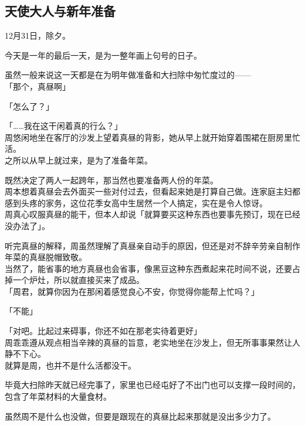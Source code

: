 \subsection{天使大人与新年准备}

12月31日，除夕。

今天是一年的最后一天，是为一整年画上句号的日子。

虽然一般来说这一天都是在为明年做准备和大扫除中匆忙度过的——\\

「那个，真昼啊」

「怎么了？」

「……我在这干闲着真的行么？」\\

周悠闲地坐在客厅的沙发上望着真昼的背影，她从早上就开始穿着围裙在厨房里忙活。\\

之所以从早上就过来，是为了准备年菜。

既然决定了两人一起跨年，那当然也要准备两人份的年菜。\\

周本想着真昼会去外面买一些对付过去，但看起来她是打算自己做。连家庭主妇都感到头疼的家务，这位花季女高中生居然一个人搞定，实在是令人惊讶。\\

周真心叹服真昼的能干，但本人却说「就算要买这种东西也要事先预订，现在已经没办法了」。

听完真昼的解释，周虽然理解了真昼亲自动手的原因，但还是对不辞辛劳亲自制作年菜的真昼脱帽致敬。\\

当然了，能省事的地方真昼也会省事，像黑豆这种东西煮起来花时间不说，还要占掉一个炉灶，所以就直接买来了成品。\\

「周君，就算你因为在那闲着感觉良心不安，你觉得你能帮上忙吗？」

「不能」

「对吧。比起过来碍事，你还不如在那老实待着更好」\\

周乖乖遵从观点相当辛辣的真昼的旨意，老实地坐在沙发上，但无所事事果然让人静不下心。\\

就算是周，也并不是什么活都没干。

毕竟大扫除昨天就已经完事了，家里也已经屯好了不出门也可以支撑一段时间的，包含了年菜材料的大量食材。

虽然周不是什么也没做，但要是跟现在的真昼比起来那就是没出多少力了。\\


